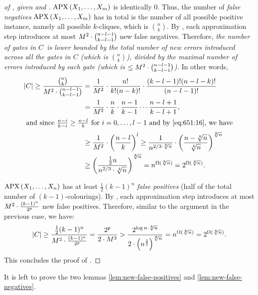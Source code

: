 \begin{proof}[of , given   and ]
\noindent {} $\operatorname{\mathrm{APX}}\left(X_1, \ldots, X_m\right) $ is identically 0. 
Thus, the number of \emph{false negatives} $\operatorname{\mathrm{APX}}\left(X_1, \ldots, X_m\right)$ has in total is the number of all possible positive instance, namely all possible $k$-cliques, which is $\binom{n}{k}$.
By ,  each approximation step introduces at most $M^2\cdot\binom{n-l-1}{k-l-1}$ new false negatives. Therefore,  \emph{the number of gates in  $C$\ is lower bounded by the total number of new errors introduced across all the  gates in $C$ (which is $\binom{n}{k}$), divided by the maximal number of errors introduced by each gate (which is $\le M^2\cdot\binom{n-l-1}{k-l-1}$).} In other words,
\begin{align*}
|C| \geq \frac{\binom{n}{k}}{M^2\cd\binom{n-l-1}{k-l-1}}
& = \frac{1}{M^2}\cd\frac{n!}{k!(n-k)!} \cdot \frac{(k-l-1)!(n-l-k)!}{(n-l-1)!} \\
& = \frac{1}{M^2}\cd \frac{n}{k} \cdot \frac{n-1}{k-1} \cdots \frac{n-l+1}{k-l+1},
\\
\intertext{
and since $\frac{n-i}{k-i} \geq \frac{n-l}{k}$
for $i=0,\dots,l-1$ and by \Cref{eq:651:16}, we have 
}
 & \geq \frac{1}{M^2}
 \cd\left(\frac{n-l}{k}\right)^l \geq
  \frac{1}{n^{2/3\cd\sqrt[8]{n}}}\cd
  \left(\frac{n-\sqrt[8]{n}}{\sqrt[4]{n}}\right)^{\sqrt[8]{n}} \\
& \ge
  \left(\frac{\frac{1}{2}n}{{n^{2/3}}\cd\sqrt[4]{n}}\right)^{\sqrt[8]{n}}
=
  n^{\Omega(\sqrt[8]{n})}
= 2^{\Omega(\sqrt[8]{n})}.
\end{align*}


\medskip 

\noindent{} $\operatorname{\mathrm{APX}}\left(X_1, \ldots, X_n\right)$ has at least $\frac{1}{2}(k-1)^n$ \emph{false positives} (half of the total number of  $(k-1)$-colourings).
By ,
each approximation step introduces at most $ M^2\cdot \frac{(k-1)^n}{2^p}$
 new false positives. Therefore,  similar to the argument  in the previous case, we have:
$$
|C| \geq \frac{\frac{1}{2}(k-1)^n}{M^2\cdot \frac{(k-1)^n}{2^p}}
= \frac{2^p}{2 \cdot M^2}
> \frac{2^{\log n\cdot \sqrt[8]{n}}}
    {2 \cdot \left(
        n^{\frac{2}{3}}
                \right)^{
                    \sqrt[8]{n}}
                    }
= n^{\Omega(\sqrt[8]{n})}
= 2^{\Omega(\sqrt[8]{n})}.
$$
This concludes the proof of .
\end{proof}
It is left to prove the two lemmas  \ref{lem:new-false-positives} and \ref{lem:new-false-negatives}. 





